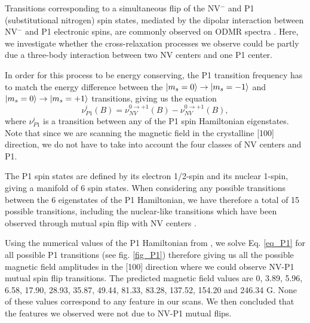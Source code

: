 \documentclass[9pt,twocolumn,twoside]{revtex4-1}
\begin{document}
Transitions corresponding to a simultaneous flip of the NV$^-$ and P1 (substitutional nitrogen) spin states, mediated by the dipolar interaction between NV$^-$ and P1 electronic spins, are commonly observed on ODMR spectra \citep{simanovskaia_sidebands_2013, kamp2018continuous, alfasi2019detection, lazda2020cross}. Here, we investigate whether the cross-relaxation processes we observe could be partly due a three-body interaction between two NV centers and one P1 center.

In order for this process to be energy conserving, the P1 transition frequency has to match the energy difference between the $\ket{m_s=0} \to \ket{m_s=-1}$ and $\ket{m_s=0} \to \ket{m_s=+1}$ transitions, giving us the equation \begin{equation}
\label{eq_P1}
\nu^i_{P1}(B)=\nu^{0 \to +1}_{NV}(B)-\nu^{0 \to +1}_{NV}(B),
\end{equation}
where $\nu^i_{P1}$ is a transition between any of the P1 spin Hamiltonian eigenstates. Note that since we are scanning the magnetic field in the crystalline [100] direction, we do not have to take into account the four classes of NV centers and P1.

The P1 spin states are defined by its electron 1/2-spin and its nuclear 1-spin, giving a manifold of 6 spin states. When considering any possible transitions between the 6 eigenstates of the P1 Hamiltonian, we have therefore a total of 15 possible transitions, including the nuclear-like transitions which have been observed through mutual spin flip with NV centers \citep{alfasi2019detection}. 


Using the numerical values of the P1 Hamiltonian from \citep{lazda2020cross}, we solve Eq. \ref{eq_P1} for all possible P1 transitions (see fig. \ref{fig_P1}) therefore giving us all the possible magnetic field amplitudes in the [100] direction where we could observe NV-P1 mutual spin flip transitions. The predicted magnetic field values are 0, 3.89, 5.96, 6.58, 17.90, 28.93, 35.87, 49.44, 81.33, 83.28, 137.52, 154.20 and 246.34 G. None of these values correspond to any feature in our scans. We then concluded that the features we observed were not due to NV-P1 mutual flips.
\end{document}
